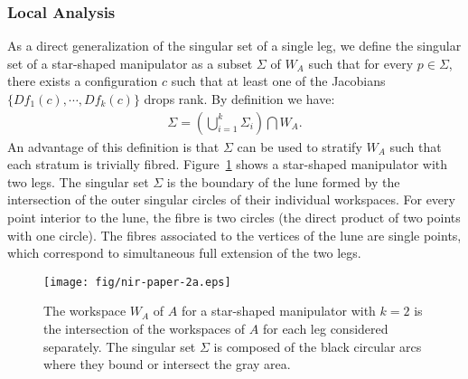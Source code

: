 \documentclass[twocolumn]{IEEEtran}
\begin{document}
\subsubsection{Local Analysis}
As a direct generalization of the singular set of a single leg, we
define the singular set of a star-shaped manipulator as a subset
$\Sigma$ of $W_A$ such that for every $p \in \Sigma$, there exists a
configuration $c$ such that at least one of the Jacobians
$\{Df_1(c),\cdots,Df_k(c)\}$ drops rank.  By definition we have:
\begin{eqnarray}
\label{eqn-01}
 \Sigma=\left(\bigcup_{i=1}^k \Sigma_i \right)\bigcap W_A.
\end{eqnarray}
An advantage of this definition is that $\Sigma$ can be used to
stratify $W_A$ such that each stratum is trivially fibred.
Figure~\ref{fig:double-leg} shows a star-shaped manipulator with two
legs.  The singular set $\Sigma$ is the boundary of the lune formed by the
intersection of the outer singular circles of their individual
workspaces.  For every point interior to the lune, the fibre is two
circles (the direct product of two points with one circle). The
fibres associated to the vertices of the lune are single points,
which correspond to simultaneous full extension of the two legs.
\begin{figure}
  \centering
  \texttt{[image: fig/nir-paper-2a.eps]}
 \caption{The workspace $W_A$ of $A$ for a star-shaped manipulator with $k=2$
    is the intersection of the workspaces of $A$ for each leg considered
    separately.  The singular set $\Sigma$ is composed of the black
    circular arcs where they bound or intersect the gray area.
    }
 \label{fig:double-leg}
\end{figure}
\end{document}
